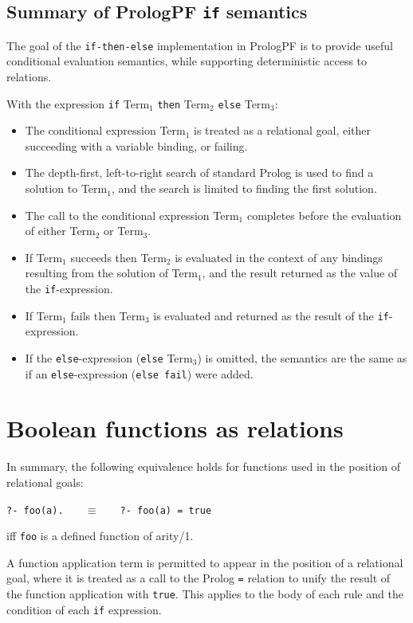 \subsection{Summary of PrologPF \texttt{if} semantics}

The goal of the \texttt{if-then-else} implementation in PrologPF is to
provide useful conditional evaluation semantics, while supporting
deterministic access to relations.

With the expression 
\texttt{if} Term$_1$ \texttt{then} Term$_2$ \texttt{else} Term$_3$:
\begin{itemize}
\item{The conditional expression Term$_1$ is treated as a relational goal, either
  succeeding with a variable binding, or failing.}
\item{The depth-first, left-to-right search of standard Prolog is used to find
  a solution to Term$_1$, and the search is limited to finding the first solution.}
\item{The call to the conditional expression Term$_1$ completes before the evaluation
  of either Term$_2$ or Term$_3$.}
\item{If Term$_1$ succeeds then Term$_2$ is evaluated in the context of any bindings
  resulting from the solution of Term$_1$, and the result returned as the value of the
  \texttt{if}-expression.}
\item{If Term$_1$ fails then Term$_3$ is evaluated and returned as the result of the
  \texttt{if}-expression.}
\item{If the \texttt{else}-expression (\texttt{else} Term$_3$) is omitted, the semantics are
  the same as if an \texttt{else}-expression (\texttt{else fail}) were added.}
\end{itemize}

\section{Boolean functions as relations} %
\label{bool}

In summary, the following equivalence holds for functions used in
the position of relational goals:\\
\centerline{\texttt{?- foo(a).~~~} $\equiv$ \texttt{~~~?- foo(a) = true}}
iff \texttt{foo} is a defined function of arity/1.

A function application term is permitted to appear in the position of
a relational goal, where it is treated as a call to the Prolog \texttt{=}
relation to unify the result of the function application with \texttt{true}.
This applies to the body of each rule and the condition of each \texttt{if}
expression.

